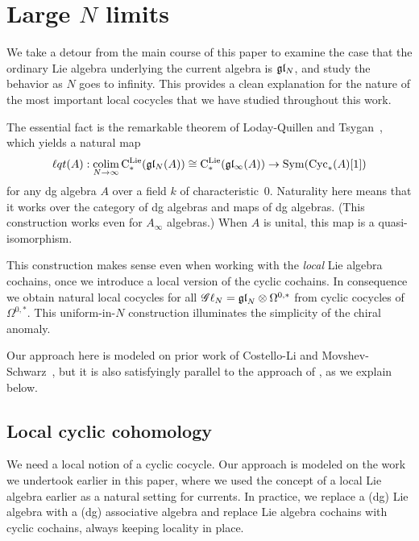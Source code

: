 \section{Large $N$ limits} \label{sec: largeN}


\def\cycls{{\rm Cyc}_*}
\def\lqt{{\ell q t}}
\def\colim{{\rm colim}}
\def\sl{\mathfrak{sl}}

We take a detour from the main course of this paper to examine the case that the ordinary Lie algebra underlying the current algebra is $\mathfrak{g} \mathfrak{l}_N$, and study the behavior as $N$ goes to infinity.
This provides a clean explanation for the nature of the most important local cocycles that we have studied throughout this work.

The essential fact is the remarkable theorem of Loday-Quillen \cite{LQ} and Tsygan~\cite{Tsy},
which yields a natural map 
\[
\lqt(A) : \underset{N \to \infty}{\colim} \, \cliels(\gl_N(A)) \cong \cliels(\gl_\infty(A)) \to \Sym(\cycls(A)[1])
\]
for any dg algebra $A$ over a field $k$ of characteristic~0.
Naturality here means that it works over the category of dg algebras and maps of dg algebras.
(This construction works even for $A_\infty$ algebras.)
When $A$ is unital, this map is a quasi-isomorphism.

This construction makes sense even when working with the {\em local} Lie algebra cochains,
once we introduce a local version of the cyclic cochains.
In consequence we obtain natural local cocycles for all $\mathscr G \ell_{N} = {\mathfrak{gl}}_N \otimes \Omega^{0,*}$
from cyclic cocycles of $\Omega^{0,*}$.
This uniform-in-$N$ construction illuminates the simplicity of the chiral anomaly.

Our approach here is modeled on prior work of Costello-Li \cite{CLbcov2} and Movshev-Schwarz~\cite{MovSch},
but it is also satisfyingly parallel to the approach of \cite{FHK},
as we explain below.

\subsection{Local cyclic cohomology}

We need a local notion of a cyclic cocycle. 
Our approach is modeled on the work we undertook earlier in this paper,
where we used the concept of a local Lie algebra earlier as a natural setting for currents. 
In practice, we replace a (dg) Lie algebra with a (dg) associative algebra and replace Lie algebra cochains with cyclic cochains, 
always keeping locality in place.

